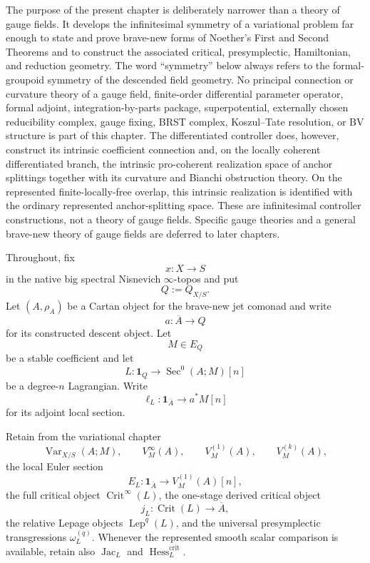 The purpose of the present chapter is deliberately narrower than a theory of gauge
fields.  It develops the infinitesimal symmetry of a variational problem far enough
to state and prove brave-new forms of Noether's First and Second Theorems and to
construct the associated critical, presymplectic, Hamiltonian, and reduction
geometry.  The word ``symmetry'' below always refers to the formal-groupoid symmetry
of the descended field geometry.  No principal connection or curvature theory of a gauge field, finite-order
differential parameter operator, formal adjoint, integration-by-parts package,
superpotential, externally chosen reducibility complex, gauge fixing, BRST complex,
Koszul--Tate resolution, or BV structure is part of this chapter.  The differentiated
controller does, however, construct its intrinsic coefficient connection and, on the
locally coherent differentiated branch, the intrinsic pro-coherent realization space
of anchor splittings together with its curvature and Bianchi obstruction theory.  On
the represented finite-locally-free overlap, this intrinsic realization is identified
with the ordinary represented anchor-splitting space.  These are infinitesimal
controller constructions, not a theory of gauge fields.  Specific gauge theories and a general brave-new theory
of gauge fields are deferred to later chapters.

Throughout, fix
\[
x:X\longrightarrow S
\]
in the native big spectral Nisnevich $\infty$-topos and put
\[
Q:=Q_{X/S}.
\]
Let $(A,\rho_A)$ be a Cartan object for the brave-new jet comonad and write
\[
a:\overline A\longrightarrow Q
\]
for its constructed descent object.  Let
\[
M\in E_Q
\]
be a stable coefficient and let
\[
L:\mathbf1_Q\longrightarrow \operatorname{Sec}^0(A;M)[n]
\]
be a degree-$n$ Lagrangian.  Write
\[
\ell_L:\mathbf1_{\overline A}\longrightarrow a^*M[n]
\]
for its adjoint local section.

Retain from the variational chapter
\[
\operatorname{Var}_{X/S}(A;M),\qquad
V_M^\infty(A),\qquad
V_M^{(1)}(A),\qquad
V_M^{(k)}(A),
\]
the local Euler section
\[
E_L:\mathbf1_{\overline A}\longrightarrow V_M^{(1)}(A)[n],
\]
the full critical object $\operatorname{Crit}^{\infty}(L)$, the one-stage derived
critical object
\[
j_L:\operatorname{Crit}(L)\longrightarrow\overline A,
\]
the relative Lepage objects $\operatorname{Lep}^q(L)$, and the universal
presymplectic transgressions $\omega_L^{(q)}$.  Whenever the represented smooth
scalar comparison is available, retain also $\operatorname{Jac}_L$ and
$\operatorname{Hess}^{\mathrm{crit}}_L$.

